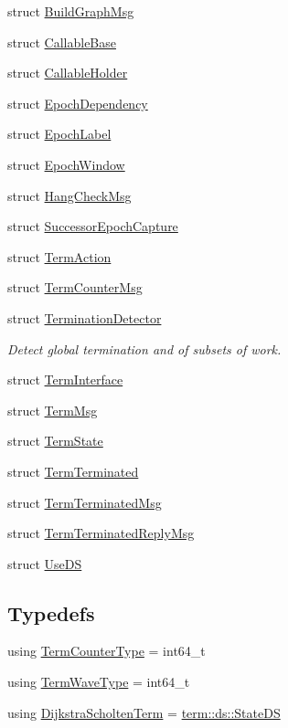 \begin{DoxyCompactItemize}
\item 
struct \hyperlink{structvt_1_1term_1_1_build_graph_msg}{Build\+Graph\+Msg}
\item 
struct \hyperlink{structvt_1_1term_1_1_callable_base}{Callable\+Base}
\item 
struct \hyperlink{structvt_1_1term_1_1_callable_holder}{Callable\+Holder}
\item 
struct \hyperlink{structvt_1_1term_1_1_epoch_dependency}{Epoch\+Dependency}
\item 
struct \hyperlink{structvt_1_1term_1_1_epoch_label}{Epoch\+Label}
\item 
struct \hyperlink{structvt_1_1term_1_1_epoch_window}{Epoch\+Window}
\item 
struct \hyperlink{structvt_1_1term_1_1_hang_check_msg}{Hang\+Check\+Msg}
\item 
struct \hyperlink{structvt_1_1term_1_1_successor_epoch_capture}{Successor\+Epoch\+Capture}
\item 
struct \hyperlink{structvt_1_1term_1_1_term_action}{Term\+Action}
\item 
struct \hyperlink{structvt_1_1term_1_1_term_counter_msg}{Term\+Counter\+Msg}
\item 
struct \hyperlink{structvt_1_1term_1_1_termination_detector}{Termination\+Detector}
\begin{DoxyCompactList}\small\item\em Detect global termination and of subsets of work. \end{DoxyCompactList}\item 
struct \hyperlink{structvt_1_1term_1_1_term_interface}{Term\+Interface}
\item 
struct \hyperlink{structvt_1_1term_1_1_term_msg}{Term\+Msg}
\item 
struct \hyperlink{structvt_1_1term_1_1_term_state}{Term\+State}
\item 
struct \hyperlink{structvt_1_1term_1_1_term_terminated}{Term\+Terminated}
\item 
struct \hyperlink{structvt_1_1term_1_1_term_terminated_msg}{Term\+Terminated\+Msg}
\item 
struct \hyperlink{structvt_1_1term_1_1_term_terminated_reply_msg}{Term\+Terminated\+Reply\+Msg}
\item 
struct \hyperlink{structvt_1_1term_1_1_use_d_s}{Use\+DS}
\end{DoxyCompactItemize}
\subsection*{Typedefs}
\begin{DoxyCompactItemize}
\item 
using \hyperlink{namespacevt_1_1term_a4fd378cdb0c36683afc1b3399d685f7f}{Term\+Counter\+Type} = int64\+\_\+t
\item 
using \hyperlink{namespacevt_1_1term_a4af17606966b2b5a6cba523bc39095a3}{Term\+Wave\+Type} = int64\+\_\+t
\item 
using \hyperlink{namespacevt_1_1term_a886197ad3670cebba77f6b87ca59b4c9}{Dijkstra\+Scholten\+Term} = \hyperlink{structvt_1_1term_1_1ds_1_1_state_d_s}{term\+::ds\+::\+State\+DS}
\end{DoxyCompactItemize}
